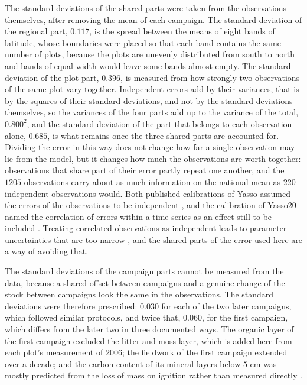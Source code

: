 \documentclass[11pt]{article}
\begin{document}
The standard deviations of the shared parts were taken from the observations
themselves, after removing the mean of each campaign. The standard deviation of the
regional part, $0.117$, is the spread between the means of eight bands of latitude,
whose boundaries were placed so that each band contains the same number of plots,
because the plots are unevenly distributed from south to north and bands of equal width
would leave some bands almost empty. The standard deviation of the plot part, $0.396$,
is measured from how strongly two observations of the same plot vary together.
Independent errors add by their variances, that is by the squares of their standard
deviations, and not by the standard deviations themselves, so the variances of the four
parts add up to the variance of the total, $0.800^2$, and the standard deviation of the
part that belongs to each observation alone, $0.685$, is what remains once the three
shared parts are accounted for. Dividing the error in this way does not change how far
a single observation may lie from the model, but it changes how much the observations
are worth together: observations that share part of their error partly repeat one
another, and the $1205$ observations carry about as much information on the national
mean as $220$ independent observations would. Both published calibrations of Yasso
assumed the errors of the observations to be independent \citep{Tuomi2009,Viskari2022},
and the calibration of Yasso20 named the correlation of errors within a time series as
an effect still to be included \citep{Viskari2022}. Treating correlated observations as
independent leads to parameter uncertainties that are too narrow
\citep{Oberpriller2021}, and the shared parts of the error used here are a way of
avoiding that.

The standard deviations of the campaign parts cannot be measured from the data,
because a shared offset between campaigns and a genuine change of the stock between
campaigns look the same in the observations. The standard deviations were therefore
prescribed: $0.030$ for each of the two later campaigns, which followed similar
protocols, and twice that, $0.060$, for the first campaign, which differs from the
later two in three documented ways. The organic layer of the first campaign excluded
the litter and moss layer, which is added here from each plot's measurement of 2006;
the fieldwork of the first campaign extended over a decade; and the carbon content of
its mineral layers below $5$ cm was mostly predicted from the loss of mass on ignition
rather than measured directly \citep{Kramarenko}.
\end{document}
